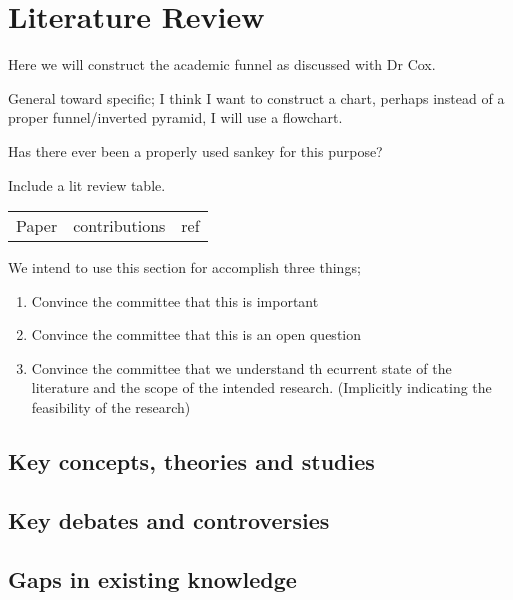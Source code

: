 \chapter{Literature Review}

Here we will construct the academic funnel as discussed with Dr Cox.

General toward specific;
I think I want to construct a chart, perhaps instead of a proper
funnel/inverted pyramid, I will use a flowchart.

Has there ever been a properly used sankey for this purpose?


Include a lit review table.

\begin{tabular}{ccc}
    Paper & contributions & ref 
\end{tabular}

We intend to use this section for accomplish three things;
\begin{enumerate}
    \item Convince the committee that this is important
    \item Convince the committee that this is an open question
    \item Convince the committee that we understand th ecurrent state of the literature and the scope of the intended research. (Implicitly indicating the feasibility of the research)
\end{enumerate}

\section{Key concepts, theories and studies}
\section{Key debates and controversies}
\section{Gaps in existing knowledge}

